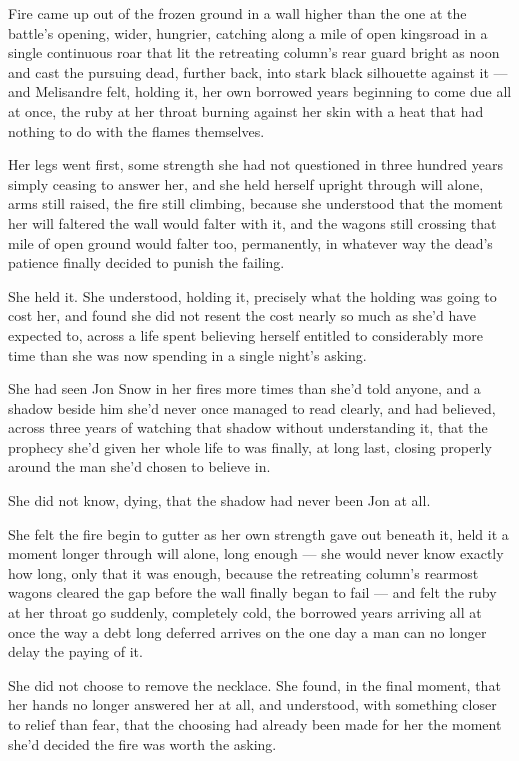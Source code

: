 Fire came up out of the frozen ground in a wall higher than the one at the battle’s opening, wider, hungrier, catching along a mile of open kingsroad in a single continuous roar that lit the retreating column’s rear guard bright as noon and cast the pursuing dead, further back, into stark black silhouette against it — and Melisandre felt, holding it, her own borrowed years beginning to come due all at once, the ruby at her throat burning against her skin with a heat that had nothing to do with the flames themselves.

Her legs went first, some strength she had not questioned in three hundred years simply ceasing to answer her, and she held herself upright through will alone, arms still raised, the fire still climbing, because she understood that the moment her will faltered the wall would falter with it, and the wagons still crossing that mile of open ground would falter too, permanently, in whatever way the dead’s patience finally decided to punish the failing.

She held it. She understood, holding it, precisely what the holding was going to cost her, and found she did not resent the cost nearly so much as she’d have expected to, across a life spent believing herself entitled to considerably more time than she was now spending in a single night’s asking.

\sceneBreak

She had seen Jon Snow in her fires more times than she’d told anyone, and a shadow beside him she’d never once managed to read clearly, and had believed, across three years of watching that shadow without understanding it, that the prophecy she’d given her whole life to was finally, at long last, closing properly around the man she’d chosen to believe in.

She did not know, dying, that the shadow had never been Jon at all.

She felt the fire begin to gutter as her own strength gave out beneath it, held it a moment longer through will alone, long enough — she would never know exactly how long, only that it was enough, because the retreating column’s rearmost wagons cleared the gap before the wall finally began to fail — and felt the ruby at her throat go suddenly, completely cold, the borrowed years arriving all at once the way a debt long deferred arrives on the one day a man can no longer delay the paying of it.

She did not choose to remove the necklace. She found, in the final moment, that her hands no longer answered her at all, and understood, with something closer to relief than fear, that the choosing had already been made for her the moment she’d decided the fire was worth the asking.

